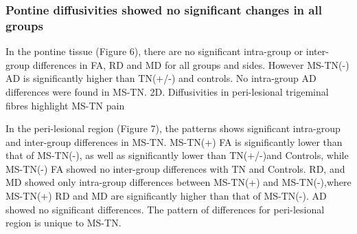 \subsubsection{Pontine diffusivities showed no significant changes in all groups}
In the pontine tissue (Figure 6), there are no significant intra-group or inter-group differences in FA, RD and MD for all groups and sides. However MS-TN(-) AD is significantly higher than TN(+/-) and controls. No intra-group AD differences were found in MS-TN.
2D. Diffusivities in peri-lesional trigeminal fibres highlight MS-TN pain

In the peri-lesional region (Figure 7), the patterns shows significant intra-group and inter-group differences in MS-TN. MS-TN(+) FA is significantly lower than that of MS-TN(-), as well as significantly lower than TN(+/-)and Controls, while MS-TN(-) FA showed no inter-group differences with TN and Controls. RD, and MD showed only intra-group differences between MS-TN(+) and MS-TN(-),where MS-TN(+) RD and MD are significantly higher than that of MS-TN(-). AD showed no significant differences. The pattern of differences for peri-lesional region is unique to MS-TN. 

